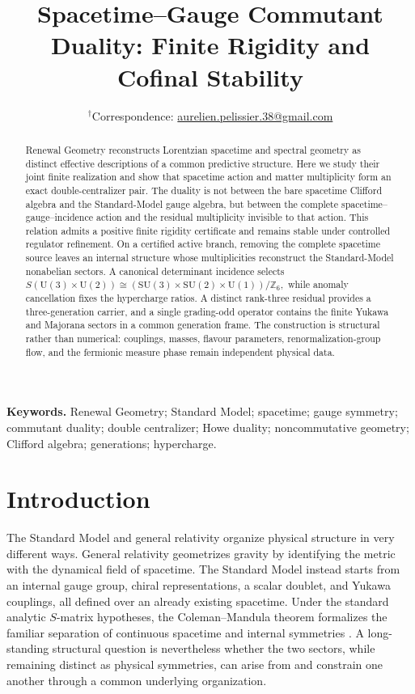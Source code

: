 \documentclass[11pt]{article}
\title{\textbf{Spacetime--Gauge Commutant Duality: Finite Rigidity and Cofinal Stability}}
\author{%
  {\small $^{\dagger}$Correspondence: \href{mailto:aurelien.pelissier.38@gmail.com}{aurelien.pelissier.38@gmail.com}}%
}
\date{}
\theoremstyle{definition}
\theoremstyle{remark}
\newcommand{\Z}{\mathbb Z}
\newcommand{\U}{\mathrm U}
\newcommand{\SU}{\mathrm{SU}}
\begin{document}
\maketitle

\begin{abstract}
Renewal Geometry reconstructs Lorentzian spacetime and spectral geometry as distinct effective descriptions of a common predictive structure. Here we study their joint finite realization and show that spacetime action and matter multiplicity form an exact double-centralizer pair. The duality is not between the bare spacetime Clifford algebra and the Standard-Model gauge algebra, but between the complete spacetime--gauge--incidence action and the residual multiplicity invisible to that action. This relation admits a positive finite rigidity certificate and remains stable under controlled regulator refinement.
%
On a certified active branch, removing the complete spacetime source leaves an internal structure whose multiplicities reconstruct the Standard-Model nonabelian sectors. A canonical determinant incidence selects $
S(\U(3)\times\U(2))
\cong
(\SU(3)\times\SU(2)\times\U(1))/\Z_6,
$ while anomaly cancellation fixes the hypercharge ratios. A distinct rank-three residual provides a three-generation carrier, and a single grading-odd operator contains the finite Yukawa and Majorana sectors in a common generation frame.
%
The construction is structural rather than numerical: couplings, masses, flavour parameters, renormalization-group flow, and the fermionic measure phase remain independent physical data.
\end{abstract}


\medskip
\noindent\textbf{Keywords.}
Renewal Geometry; Standard Model; spacetime; gauge symmetry; commutant duality;
double centralizer; Howe duality; noncommutative geometry; Clifford algebra;
generations; hypercharge.

\section{Introduction}
\label{sec:introduction}

The Standard Model and general relativity organize physical structure in very
different ways.  General relativity geometrizes gravity by identifying the
metric with the dynamical field of spacetime.  The Standard Model instead
starts from an internal gauge group, chiral representations, a scalar doublet,
and Yukawa couplings, all defined over an already existing spacetime.  Under
the standard analytic $S$-matrix hypotheses, the Coleman--Mandula theorem
formalizes the familiar separation of continuous spacetime and internal
symmetries \cite{ColemanMandula1967}.  A long-standing structural question is
nevertheless whether the two sectors, while remaining distinct as physical
symmetries, can arise from and constrain one another through a common
underlying organization.
\end{document}
